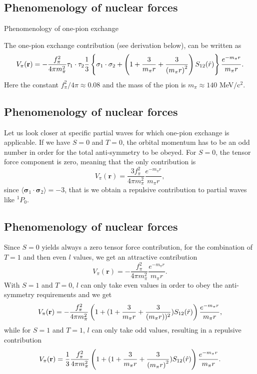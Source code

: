 \documentclass[%
twoside,                 %
final,                   %
10pt]{article}
\begin{document}
\subsection{Phenomenology of nuclear forces}
\begin{block}{Phenomenology of one-pion exchange }

The one-pion exchange contribution (see derivation below), can be written as 
\[
V_{\pi}(\mathbf{r})= -\frac{f_{\pi}^{2}}{4\pi m_{\pi}^{2}}\mathbf{ \tau}_1\cdot\mathbf{\tau}_2
\frac{1}{3}\left\{\mathbf{ \sigma}_1\cdot\mathbf{ \sigma}_2+\left( 1 + {3\over m_\pi r} + {3\over\left(m_\pi r\right)^2}\right) S_{12} (\hat r)\right\} \frac{e^{-m_\pi r}}{m_\pi r}.
\]
Here the constant $f_{\pi}^{2}/4\pi\approx 0.08$ and the mass of the pion is $m_\pi\approx 140$ MeV$/\mbox{c}^2$.  

\end{block}
\subsection{Phenomenology of nuclear forces}
\begin{block}{}
Let us look closer at specific partial waves for which one-pion exchange is applicable. If we have $S=0$ and $T=0$, the 
orbital momentum has to be an odd number in order for the total anti-symmetry to be obeyed. For $S=0$, the tensor force component is zero, meaning that 
the only contribution is 
\[
V_{\pi}(\mathbf{r})=\frac{3f_{\pi}^{2}}{4\pi m_{\pi}^{2}}\frac{e^{-m_\pi r}}{m_\pi r},
\]
since $\langle\mathbf{ \sigma}_1\cdot\mathbf{ \sigma}_2\rangle=-3$, that is we obtain a repulsive contribution to partial waves like 
$^1P_0$.

\end{block}
\subsection{Phenomenology of nuclear forces}
\begin{block}{}
Since $S=0$ yields always a zero tensor force contribution, for the combination of $T=1$ and then even $l$ values, we get an attractive contribution
\[
V_{\pi}(\mathbf{r})=-\frac{f_{\pi}^{2}}{4\pi m_{\pi}^{2}}\frac{e^{-m_\pi r}}{m_\pi r}.
\]
With $S=1$ and $T=0$, $l$ can only take even values in order to obey the anti-symmetry requirements and we get
\[
V_{\pi}(\mathbf{r})= -\frac{f_{\pi}^{2}}{4\pi m_{\pi}^{2}}
\left(1+( 1 + {3\over m_\pi r} + {3\over\left(m_\pi r\right))^2}) S_{12} (\hat r)\right) \frac{e^{-m_\pi r}}{m_\pi r},
\]
while for $S=1$ and $T=1$, $l$ can only take odd values, resulting in a repulsive contribution 
\[
V_{\pi}(\mathbf{r})= \frac{1}{3}\frac{f_{\pi}^{2}}{4\pi m_{\pi}^{2}}\left(1+( 1 + {3\over m_\pi r} + {3\over\left(m_\pi r\right)^2}) S_{12} (\hat r)\right) \frac{e^{-m_\pi r}}{m_\pi r}.
\]

\end{block}
\end{document}
